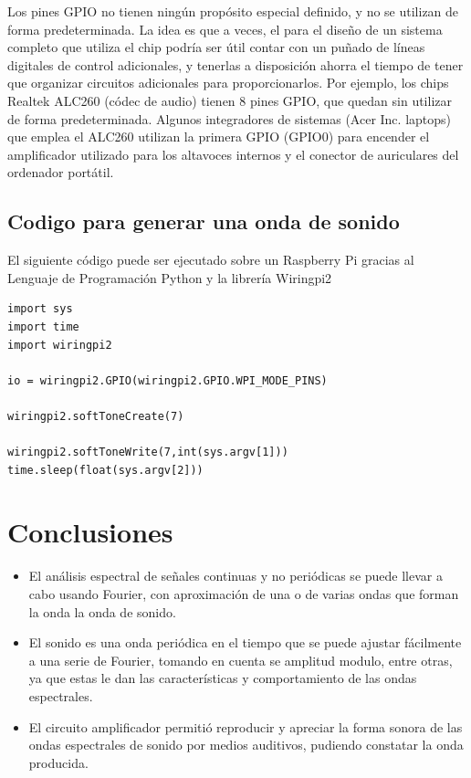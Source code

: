 \documentclass[10pt,a4paper]{book}
\begin{document}
Los pines GPIO no tienen ningún propósito especial definido, y no se utilizan de forma predeterminada. La idea es que a veces, el para el diseño de un sistema completo que utiliza el chip podría ser útil contar con un puñado de líneas digitales de control adicionales, y tenerlas a disposición ahorra el tiempo de tener que organizar circuitos adicionales para proporcionarlos. Por ejemplo, los chips Realtek ALC260 (códec de audio) tienen 8 pines GPIO, que quedan sin utilizar de forma predeterminada. Algunos integradores de sistemas (Acer Inc. laptops) que emplea el ALC260 utilizan la primera GPIO (GPIO0) para encender el amplificador utilizado para los altavoces internos y el conector de auriculares del ordenador portátil.\\

\subsection{Codigo para generar una onda de sonido}

El siguiente código puede ser ejecutado sobre un Raspberry Pi gracias al Lenguaje de Programación Python y la librería Wiringpi2
\begin{verbatim}
import sys
import time
import wiringpi2

io = wiringpi2.GPIO(wiringpi2.GPIO.WPI_MODE_PINS)

wiringpi2.softToneCreate(7)

wiringpi2.softToneWrite(7,int(sys.argv[1]))
time.sleep(float(sys.argv[2]))
\end{verbatim}



\section{Conclusiones}

\begin{itemize}

\item El análisis espectral de señales continuas y no periódicas se puede llevar a cabo usando Fourier, con aproximación de una o de varias ondas que forman la onda la onda de sonido.
\item El sonido es una onda periódica en el tiempo que se puede ajustar fácilmente a una serie de Fourier, tomando en cuenta se amplitud modulo, entre otras, ya que estas le  dan las características y comportamiento de las ondas espectrales. 
\item El circuito amplificador permitió reproducir y apreciar la forma sonora de las ondas espectrales de sonido por medios auditivos, pudiendo constatar la onda producida.

\end{itemize}
\end{document}
